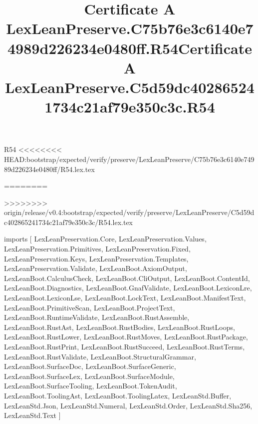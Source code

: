 \begin{lexlean}{R54}
<<<<<<<< HEAD:bootstrap/expected/verify/preserve/LexLeanPreserve/C75b76e3c6140e74989d226234e0480ff/R54.lex.tex
\title{Certificate A LexLeanPreserve.C75b76e3c6140e74989d226234e0480ff.R54}
========
\title{Certificate A LexLeanPreserve.C5d59dc402865241734c21af79e350c3c.R54}
>>>>>>>> origin/release/v0.4:bootstrap/expected/verify/preserve/LexLeanPreserve/C5d59dc402865241734c21af79e350c3c/R54.lex.tex
\begin{coremodule}
imports [
  LexLeanPreservation.Core,
  LexLeanPreservation.Values,
  LexLeanPreservation.Primitives,
  LexLeanPreservation.Fixed,
  LexLeanPreservation.Keys,
  LexLeanPreservation.Templates,
  LexLeanPreservation.Validate,
  LexLeanBoot.AxiomOutput,
  LexLeanBoot.CalculusCheck,
  LexLeanBoot.CliOutput,
  LexLeanBoot.ContentId,
  LexLeanBoot.Diagnostics,
  LexLeanBoot.GnafValidate,
  LexLeanBoot.LexiconLre,
  LexLeanBoot.LexiconLse,
  LexLeanBoot.LockText,
  LexLeanBoot.ManifestText,
  LexLeanBoot.PrimitiveScan,
  LexLeanBoot.ProjectText,
  LexLeanBoot.RuntimeValidate,
  LexLeanBoot.RustAssemble,
  LexLeanBoot.RustAst,
  LexLeanBoot.RustBodies,
  LexLeanBoot.RustLoops,
  LexLeanBoot.RustLower,
  LexLeanBoot.RustMoves,
  LexLeanBoot.RustPackage,
  LexLeanBoot.RustPrint,
  LexLeanBoot.RustSucceed,
  LexLeanBoot.RustTerms,
  LexLeanBoot.RustValidate,
  LexLeanBoot.StructuralGrammar,
  LexLeanBoot.SurfaceDoc,
  LexLeanBoot.SurfaceGeneric,
  LexLeanBoot.SurfaceLex,
  LexLeanBoot.SurfaceModule,
  LexLeanBoot.SurfaceTooling,
  LexLeanBoot.TokenAudit,
  LexLeanBoot.ToolingAst,
  LexLeanBoot.ToolingLatex,
  LexLeanStd.Buffer,
  LexLeanStd.Json,
  LexLeanStd.Numeral,
  LexLeanStd.Order,
  LexLeanStd.Sha256,
  LexLeanStd.Text
]


\end{coremodule}
\end{lexlean}
